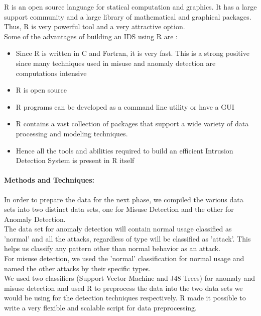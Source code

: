 \documentclass{article}
\begin{document}
R is an open source language for statical computation and graphics. It has a large support community and a large library of mathematical and graphical packages. Thus, R is very powerful tool and a very attractive option.\\

Some of the advantages of building an IDS using R are :
\begin{itemize}
  \item Since R is written in C and Fortran, it is very fast. This is a strong positive since many techniques used in misuse and anomaly detection are computations intensive
  \item R is open source
  \item R programs can be developed as a command line utility or have a GUI
  \item R contains a vast collection of packages that support a wide variety of data processing and modeling techniques.
  \item Hence all the tools and abilities required to build an efficient Intrusion Detection System is present in R itself
\end{itemize}
   
  
\paragraph{Methods and Techniques:\\}

In order to prepare the data for the next phase, we compiled the various data sets into two distinct data sets, one for Misuse Detection and the other for Anomaly Detection.\\

The data set for anomaly detection will contain normal usage classified as 'normal' and all the attacks, regardless of type will be classified as 'attack'. This helps us classify any pattern other than normal behavior as an attack.\\

For misuse detection, we used the 'normal' classification for normal usage and named the other attacks by their specific types.\\

We used two classifiers (Support Vector Machine and J48 Trees) for anomaly and misuse detection and used R to preprocess the data into the two data sets we would be using for the detection techniques respectively. R made it possible to write a very flexible and scalable script for data preprocessing.
\end{document}
